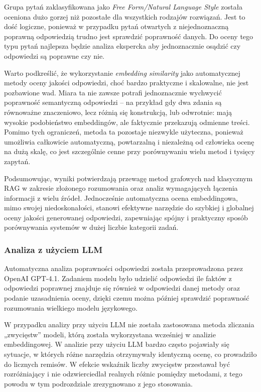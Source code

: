 \documentclass[
a4paper,
12pt,
]{article}
\newcounter{subsubsubsection}[subsubsection]
\begin{document}
Grupa pytań zaklasyfikowana jako \textit{Free Form/Natural Language Style} została oceniona dużo gorzej niż pozostałe dla wszystkich rodzajów rozwiązań. Jest to dość logiczne, ponieważ w przypadku pytań otwartych z niejednoznaczną poprawną odpowiedzią trudno jest sprawdzić poprawność danych. Do oceny tego typu pytań najlepsza będzie analiza ekspercka aby jednoznacznie osądzić czy odpowiedzi są poprawne czy nie. 

Warto podkreślić, że wykorzystanie\textit{ embedding similarity} jako automatycznej metody oceny jakości odpowiedzi, choć bardzo praktyczne i skalowalne, nie jest pozbawione wad. Miara ta nie zawsze potrafi jednoznacznie wychwycić poprawność semantyczną odpowiedzi -- na przykład gdy dwa zdania są równoważne znaczeniowo, lecz różnią się konstrukcją, lub odwrotnie: mają wysokie podobieństwo embeddingów, ale faktycznie przekazują odmienne treści. Pomimo tych ograniczeń, metoda ta pozostaje niezwykle użyteczna, ponieważ umożliwia całkowicie automatyczną, powtarzalną i niezależną od człowieka ocenę na dużą skalę, co jest szczególnie cenne przy porównywaniu wielu metod i tysięcy zapytań.

Podsumowując, wyniki potwierdzają przewagę metod grafowych nad klasycznym RAG w zakresie złożonego rozumowania oraz analiz wymagających łączenia informacji z wielu źródeł. Jednocześnie automatyczna ocena embeddingowa, mimo swojej niedoskonałości, stanowi efektywne narzędzie do szybkiej i globalnej oceny jakości generowanej odpowiedzi, zapewniając spójny i praktyczny sposób porównywania systemów w dużej liczbie kategorii zadań.

\subsubsection{Analiza z użyciem LLM}
Automatyczna analiza poprawności odpowiedzi została przeprowadzona przez OpenAI GPT-4.1. Zadaniem modelu było udzielić odpowiedzi ile faktów z odpowiedzi poprawnej znajduje się również w odpowiedzi danej metody oraz podanie uzasadnienia oceny, dzięki czemu można później sprawdzić poprawność rozumowania wielkiego modelu językowego.  

W przypadku analizy przy użyciu LLM nie została zastosowana metoda zliczania „zwycięstw” modeli, którą została wykorzystana wcześniej w analizie embeddingowej. W analizie przy użyciu LLM bardzo często pojawiały się sytuacje, w których różne narzędzia otrzymywały identyczną ocenę, co prowadziło do licznych remisów. W efekcie wskaźnik liczby zwycięstw przestawał być rozróżniający i nie odzwierciedlał realnych różnic pomiędzy metodami, z tego powodu w tym podrozdziale zrezygnowano z jego stosowania.
\end{document}

